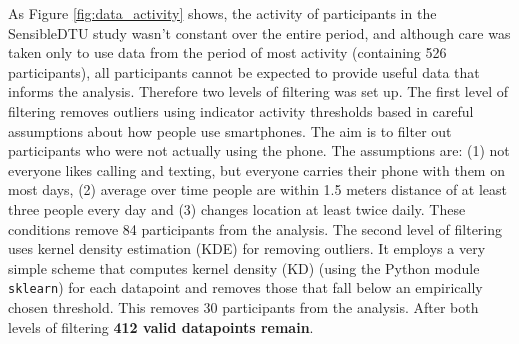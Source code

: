 As Figure \ref{fig:data_activity} shows, the activity of participants in the SensibleDTU study wasn't constant over the entire period, and although care was taken only to use data from the period of most activity (containing 526 participants), all participants cannot be expected to provide useful data that informs the analysis. Therefore two levels of filtering was set up.
The first level of filtering removes outliers using indicator activity thresholds based in careful assumptions about how people use smartphones. The aim is to filter out participants who were not actually using the phone. The assumptions are: (1) not everyone likes calling and texting, but everyone carries their phone with them on most days, (2) average over time people are within 1.5 meters distance of at least three people every day and (3) changes location at least twice daily. These conditions remove 84 participants from the analysis.
The second level of filtering uses kernel density estimation (KDE) for removing outliers. It employs a very simple scheme that computes kernel density (KD) (using the Python module \texttt{sklearn}) for each datapoint and removes those that fall below an empirically chosen threshold. This removes 30 participants from the analysis.
After both levels of filtering \textbf{412 valid datapoints remain}.